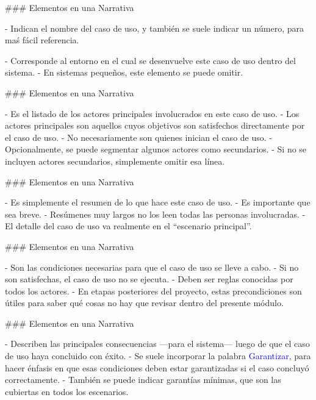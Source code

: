 ### Elementos en una Narrativa

\newline

- Indican el nombre del caso de uso, y también se suele indicar un número, para maś fácil referencia.

\newline

- Corresponde al entorno en el cual se desenvuelve este caso de uso dentro del sistema.
- En sistemas pequeños, este elemento se puede omitir.

### Elementos en una Narrativa

\newline

- Es el listado de los actores principales involucrados en este caso de uso.
    - Los actores principales son aquellos cuyos objetivos son satisfechos directamente
    por el caso de uso.
    - No necesariamente son quienes inician el caso de uso.
- Opcionalmente, se puede segmentar algunos actores como secundarios.
    - Si no se incluyen actores secundarios, simplemente omitir esa línea.


### Elementos en una Narrativa

\newline

- Es simplemente el resumen de lo que hace este caso de uso.
- Es importante que sea breve.
    - Resúmenes muy largos no los leen todas las personas involucradas.
    - El detalle del caso de uso va realmente en el ``escenario principal''.

### Elementos en una Narrativa

\newline

- Son las condiciones necesarias para que el caso de uso se lleve a cabo.
    - Si no son satisfechas, el caso de uso no se ejecuta.
- Deben ser reglas conocidas por todos los actores.
- En etapas posteriores del proyecto, estas precondiciones son útiles para
saber qué cosas no hay que revisar dentro del presente módulo.

### Elementos en una Narrativa

\newline

- Describen las principales consecuencias ---para el sistema--- luego de que el caso de uso haya
concluido con éxito.
- Se suele incorporar la palabra \textcolor{blue}{Garantizar}, para hacer énfasis en que
esas condiciones deben estar garantizadas si el caso concluyó correctamente.
    - También se puede indicar garantías mínimas, que son las cubiertas en todos los escenarios.


